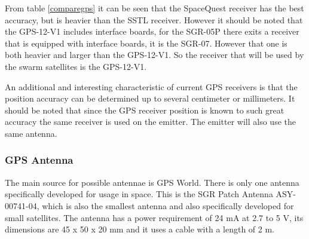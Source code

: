 From table \ref{comparegps} it can be seen that the SpaceQuest receiver has the best accuracy, but is heavier than the \acs{SSTL} receiver. However it should be noted that the GPS-12-V1 includes interface boards, for the SGR-05P there exits a receiver that is equipped with interface boards, it is the SGR-07. However that one is both heavier and larger than the GPS-12-V1. So the receiver that will be used by the swarm satellites is the GPS-12-V1.

An additional and interesting characteristic of current \acs{GPS} receivers is that the position accuracy can be determined up to several centimeter or millimeters. It should be noted that since the \acs{GPS} receiver position is known to such great accuracy the same receiver is used on the emitter. The emitter will also use the same antenna.

\subsubsection{GPS Antenna}
The main source for possible antennae is GPS World. There is only one antenna specifically developed for usage in space. This is the SGR Patch Antenna ASY-00741-04, which is also the smallest antenna and also specifically developed for small satellites.
The antenna has a power requirement of 24 mA at 2.7 to 5 V, its dimensions are 45 x 50 x 20 mm and it uses a cable with a length of 2 m.